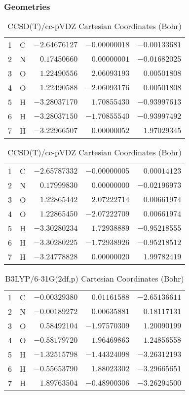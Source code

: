 \documentclass[10pt,oneside]{article}
\begin{document}
\begin{table}[h!]
\subsubsection*{Geometries}
\begin{multicols}{2}
\centering
\caption{CCSD(T)/cc-pVTZ Cartesian Coordinates (Bohr)}
\begin{tabular}{llrrr}
\toprule
1  & C  & $-2.64676127$ & $-0.00000018$ & $-0.00133681$ \\
2  & N  & $ 0.17450660$ & $ 0.00000001$ & $-0.01682025$ \\
3  & O  & $ 1.22490556$ & $ 2.06093193$ & $ 0.00501808$ \\
4  & O  & $ 1.22490588$ & $-2.06093176$ & $ 0.00501808$ \\
5  & H  & $-3.28037170$ & $ 1.70855430$ & $-0.93997613$ \\
6  & H  & $-3.28037150$ & $-1.70855540$ & $-0.93997492$ \\
7  & H  & $-3.22966507$ & $ 0.00000052$ & $ 1.97029345$ \\
\bottomrule
\end{tabular}
\caption{CCSD(T)/cc-pVDZ Cartesian Coordinates (Bohr)}
\begin{tabular}{llrrr}
\toprule
1  & C  & $-2.65787332$ & $-0.00000005$ & $ 0.00014123$ \\
2  & N  & $ 0.17999830$ & $ 0.00000000$ & $-0.02196973$ \\
3  & O  & $ 1.22865442$ & $ 2.07222714$ & $ 0.00661974$ \\
4  & O  & $ 1.22865450$ & $-2.07222709$ & $ 0.00661974$ \\
5  & H  & $-3.30280234$ & $ 1.72938889$ & $-0.95218555$ \\
6  & H  & $-3.30280225$ & $-1.72938926$ & $-0.95218512$ \\
7  & H  & $-3.24778828$ & $ 0.00000020$ & $ 1.99782419$ \\
\bottomrule
\end{tabular}
\end{multicols}
\end{table}

\begin{table}[h]
\centering
\caption{B3LYP/6-31G(2df,p) Cartesian Coordinates (Bohr)}
\begin{tabular}{llrrr}
\toprule
1  & C  & $-0.00329380$ & $ 0.01161588$ & $-2.65136611$ \\
2  & N  & $-0.00189272$ & $ 0.00635881$ & $ 0.18117131$ \\
3  & O  & $ 0.58492104$ & $-1.97570309$ & $ 1.20090199$ \\
4  & O  & $-0.58179720$ & $ 1.96469863$ & $ 1.24856558$ \\
5  & H  & $-1.32515798$ & $-1.44324098$ & $-3.26312193$ \\
6  & H  & $-0.55653790$ & $ 1.88023302$ & $-3.29665651$ \\
7  & H  & $ 1.89763504$ & $-0.48900306$ & $-3.26294500$ \\
\bottomrule
\end{tabular}
\end{table}
\end{document}
